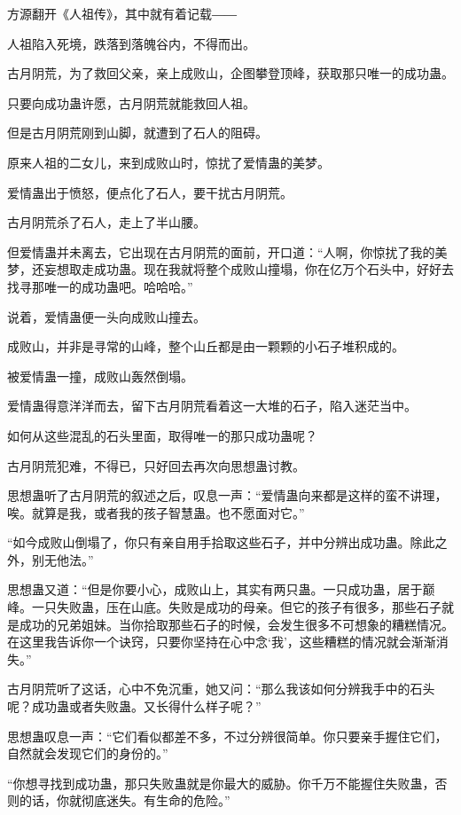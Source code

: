 
\begin{this_body}

方源翻开《人祖传》，其中就有着记载――

人祖陷入死境，跌落到落魄谷内，不得而出。

古月阴荒，为了救回父亲，亲上成败山，企图攀登顶峰，获取那只唯一的成功蛊。

只要向成功蛊许愿，古月阴荒就能救回人祖。

但是古月阴荒刚到山脚，就遭到了石人的阻碍。

原来人祖的二女儿，来到成败山时，惊扰了爱情蛊的美梦。

爱情蛊出于愤怒，便点化了石人，要干扰古月阴荒。

古月阴荒杀了石人，走上了半山腰。

但爱情蛊并未离去，它出现在古月阴荒的面前，开口道：“人啊，你惊扰了我的美梦，还妄想取走成功蛊。现在我就将整个成败山撞塌，你在亿万个石头中，好好去找寻那唯一的成功蛊吧。哈哈哈。”

说着，爱情蛊便一头向成败山撞去。

成败山，并非是寻常的山峰，整个山丘都是由一颗颗的小石子堆积成的。

被爱情蛊一撞，成败山轰然倒塌。

爱情蛊得意洋洋而去，留下古月阴荒看着这一大堆的石子，陷入迷茫当中。

如何从这些混乱的石头里面，取得唯一的那只成功蛊呢？

古月阴荒犯难，不得已，只好回去再次向思想蛊讨教。

思想蛊听了古月阴荒的叙述之后，叹息一声：“爱情蛊向来都是这样的蛮不讲理，唉。就算是我，或者我的孩子智慧蛊。也不愿面对它。”

“如今成败山倒塌了，你只有亲自用手拾取这些石子，并中分辨出成功蛊。除此之外，别无他法。”

思想蛊又道：“但是你要小心，成败山上，其实有两只蛊。一只成功蛊，居于巅峰。一只失败蛊，压在山底。失败是成功的母亲。但它的孩子有很多，那些石子就是成功的兄弟姐妹。当你拾取那些石子的时候，会发生很多不可想象的糟糕情况。在这里我告诉你一个诀窍，只要你坚持在心中念‘我’，这些糟糕的情况就会渐渐消失。”

古月阴荒听了这话，心中不免沉重，她又问：“那么我该如何分辨我手中的石头呢？成功蛊或者失败蛊。又长得什么样子呢？”

思想蛊叹息一声：“它们看似都差不多，不过分辨很简单。你只要亲手握住它们，自然就会发现它们的身份的。”

“你想寻找到成功蛊，那只失败蛊就是你最大的威胁。你千万不能握住失败蛊，否则的话，你就彻底迷失。有生命的危险。”


\end{this_body}
